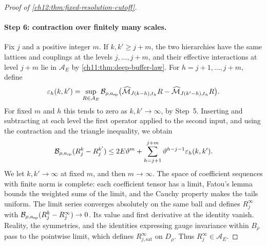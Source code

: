 \begin{proof}[Proof of \cref{ch12:thm:fixed-resolution-cutoff}]
\paragraph{Step 6: contraction over finitely many scales.}
Fix $j$ and a positive integer $m$. If $k,k'\ge j+m$, the two hierarchies have the same lattices and couplings at the levels $j,\ldots,j+m$, and their effective interactions at level $j+m$ lie in $\mathcal A_E$ by \cref{ch11:thm:deep-buffer-law}. For $h=j+1,\ldots,j+m$, define
\[
 \varepsilon_h(k,k')=\sup_{R\in\mathcal A_E}\mathcal B_{\rho,a_{\mathrm{sp}}}\bigl(\widehat{\mathcal M}_{J(k-h),t_h}R-\widehat{\mathcal M}_{J(k'-h),t_h}R\bigr).
\]
For fixed $m$ and $h$ this tends to zero as $k,k'\to\infty$, by Step~5. Inserting and subtracting at each level the first operator applied to the second input, and using the contraction and the triangle inequality, we obtain
\begin{equation}
 \mathcal B_{\rho,a_{\mathrm{sp}}}(R_j^k-R_j^{k'})\le2E\vartheta^m+\sum_{h=j+1}^{j+m}\vartheta^{h-j-1}\varepsilon_h(k,k'). \label{ch12:eq:suffix}
\end{equation}
We let $k,k'\to\infty$ at fixed $m$, and then $m\to\infty$. The space of coefficient sequences with finite norm is complete: each coefficient tensor has a limit, Fatou's lemma bounds the weighted sums of the limit, and the Cauchy property makes the tails uniform. The limit series converges absolutely on the same ball and defines $R_j^\infty$ with $\mathcal B_{\rho,a_{\mathrm{sp}}}(R_j^k-R_j^\infty)\to0$. Its value and first derivative at the identity vanish. Reality, the symmetries, and the identities expressing gauge invariance within $B_\rho$ pass to the pointwise limit, which defines $R_{j,\mathrm{sat}}^\infty$ on $D_\rho$. Thus $R_j^\infty\in\mathcal A_E$.


\end{proof}
